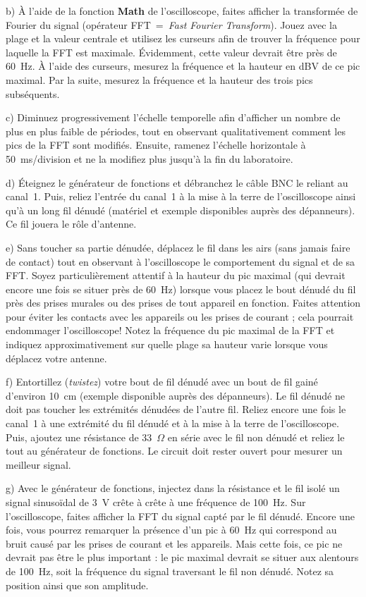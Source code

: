 \documentclass[canadien,12pt,oneside,letterpaper]{article}
\begin{document}
b) À l'aide de la fonction \textbf{Math} de l'oscilloscope, faites afficher la transformée de Fourier du signal (opérateur FFT~=~\textit{Fast Fourier Transform}). Jouez avec la plage et la valeur centrale et utilisez les curseurs afin de trouver la fréquence pour laquelle la FFT est maximale. Évidemment, cette valeur devrait être près de 60~Hz. À l'aide des curseurs, mesurez la fréquence et la hauteur en dBV de ce pic maximal. Par la suite, mesurez la fréquence et la hauteur des trois pics subséquents.

c) Diminuez progressivement l'échelle temporelle afin d'afficher un nombre de plus en plus faible de périodes, tout en observant qualitativement comment les pics de la FFT sont modifiés. Ensuite, ramenez l'échelle horizontale à 50~ms/division et ne la modifiez plus jusqu'à la fin du laboratoire.

d) Éteignez le générateur de fonctions et débranchez le câble BNC le reliant au canal~1. Puis, reliez l'entrée du canal~1 à la mise à la terre de l'oscilloscope ainsi qu'à un long fil dénudé (matériel et exemple disponibles auprès des dépanneurs). Ce fil jouera le rôle d'antenne.

e) Sans toucher sa partie dénudée, déplacez le fil dans les airs (sans jamais faire de contact) tout en observant à l'oscilloscope le comportement du signal et de sa FFT. Soyez particulièrement attentif à la hauteur du pic maximal (qui devrait encore une fois se situer près de 60~Hz) lorsque vous placez le bout dénudé du fil près des prises murales ou des prises de tout appareil en fonction. Faites attention pour éviter les contacts avec les appareils ou les prises de courant ; cela pourrait endommager l'oscilloscope! Notez la fréquence du pic maximal de la FFT et indiquez approximativement sur quelle plage sa hauteur varie lorsque vous déplacez votre antenne.

f) Entortillez (\textit{twistez}) votre bout de fil dénudé avec un bout de fil gainé d'environ 10~cm (exemple disponible auprès des dépanneurs). Le fil dénudé ne doit pas toucher les extrémités dénudées de l'autre fil. Reliez encore une fois le canal~1 à une extrémité du fil dénudé et à la mise à la terre de l'oscilloscope. Puis, ajoutez une résistance de 33~$\Omega$ en série avec le fil non dénudé et reliez le tout au générateur de fonctions. Le circuit doit rester ouvert pour mesurer un meilleur signal.

g) Avec le générateur de fonctions, injectez dans la résistance et le fil isolé un signal sinusoïdal de 3~V crête à crête à une fréquence de 100~Hz. Sur l'oscilloscope, faites afficher la FFT du signal capté par le fil dénudé. Encore une fois, vous pourrez remarquer la présence d'un pic à 60~Hz qui correspond au bruit causé par les prises de courant et les appareils. Mais cette fois, ce pic ne devrait pas être le plus important : le pic maximal devrait se situer aux alentours de 100~Hz, soit la fréquence du signal traversant le fil non dénudé. Notez sa position ainsi que son amplitude.
\end{document}
